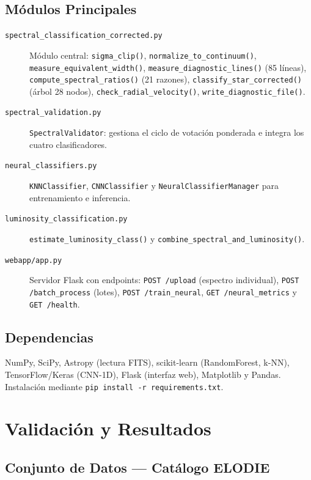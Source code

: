 \documentclass[12pt,a4paper]{article}
\begin{document}
\subsection{Módulos Principales}

\begin{description}
  \item[\texttt{spectral\_classification\_corrected.py}]
    Módulo central: \texttt{sigma\_clip()}, \texttt{normalize\_to\_continuum()},
    \texttt{measure\_equivalent\_width()}, \texttt{measure\_diagnostic\_lines()}
    (85 líneas), \texttt{compute\_spectral\_ratios()} (21 razones),
    \texttt{classify\_star\_corrected()} (árbol 28 nodos),
    \texttt{check\_radial\_velocity()}, \texttt{write\_diagnostic\_file()}.
  \item[\texttt{spectral\_validation.py}]
    \texttt{SpectralValidator}: gestiona el ciclo de votación ponderada e integra
    los cuatro clasificadores.
  \item[\texttt{neural\_classifiers.py}]
    \texttt{KNNClassifier}, \texttt{CNNClassifier} y
    \texttt{NeuralClassifierManager} para entrenamiento e inferencia.
  \item[\texttt{luminosity\_classification.py}]
    \texttt{estimate\_luminosity\_class()} y
    \texttt{combine\_spectral\_and\_luminosity()}.
  \item[\texttt{webapp/app.py}]
    Servidor Flask con endpoints: \texttt{POST /upload} (espectro individual),
    \texttt{POST /batch\_process} (lotes), \texttt{POST /train\_neural},
    \texttt{GET /neural\_metrics} y \texttt{GET /health}.
\end{description}

\subsection{Dependencias}

NumPy, SciPy, Astropy (lectura FITS), scikit-learn (RandomForest, k-NN),
TensorFlow/Keras (CNN-1D), Flask (interfaz web), Matplotlib y Pandas.
Instalación mediante \texttt{pip install -r requirements.txt}.

\section{Validación y Resultados}

\subsection{Conjunto de Datos — Catálogo ELODIE}
\end{document}
